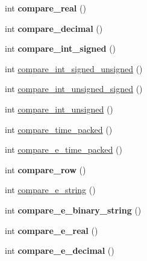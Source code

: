 \begin{DoxyCompactItemize}
\item 
\mbox{\label{classArg__comparator_abfbec75a34100c001875750b95c07d3d}} 
int {\bfseries compare\+\_\+real} ()
\item 
\mbox{\label{classArg__comparator_aeab095becc5f7ffd3933c5b3d3d16a7e}} 
int {\bfseries compare\+\_\+decimal} ()
\item 
\mbox{\label{classArg__comparator_aa4ffd1d7b8e6f8bd0a5f06cb2240b664}} 
int {\bfseries compare\+\_\+int\+\_\+signed} ()
\item 
int \mbox{\hyperlink{classArg__comparator_a2935ef4c52e7d7c9fb7362886505fefb}{compare\+\_\+int\+\_\+signed\+\_\+unsigned}} ()
\item 
int \mbox{\hyperlink{classArg__comparator_a4099370ecb21ca01a34105665f17271b}{compare\+\_\+int\+\_\+unsigned\+\_\+signed}} ()
\item 
int \mbox{\hyperlink{classArg__comparator_afa02aad4a508924229ef1fc5b3cf8a37}{compare\+\_\+int\+\_\+unsigned}} ()
\item 
int \mbox{\hyperlink{classArg__comparator_a112f9c09e14094ac8ec253eee291d554}{compare\+\_\+time\+\_\+packed}} ()
\item 
int \mbox{\hyperlink{classArg__comparator_a02a121c652002741574845f27160c09c}{compare\+\_\+e\+\_\+time\+\_\+packed}} ()
\item 
\mbox{\label{classArg__comparator_aeb0b69f1bf8722a75a5db5fc24336822}} 
int {\bfseries compare\+\_\+row} ()
\item 
int \mbox{\hyperlink{classArg__comparator_a91138032fba5f584e6130d3bffcc2177}{compare\+\_\+e\+\_\+string}} ()
\item 
\mbox{\label{classArg__comparator_a3160e7e6d89d6508586f0403fce384b3}} 
int {\bfseries compare\+\_\+e\+\_\+binary\+\_\+string} ()
\item 
\mbox{\label{classArg__comparator_a2cbd877a1f016a4585ef71b15dca862b}} 
int {\bfseries compare\+\_\+e\+\_\+real} ()
\item 
\mbox{\label{classArg__comparator_a4e39f06466147ac474936dec8ed974e3}} 
int {\bfseries compare\+\_\+e\+\_\+decimal} ()
\item 

\end{DoxyCompactItemize}
